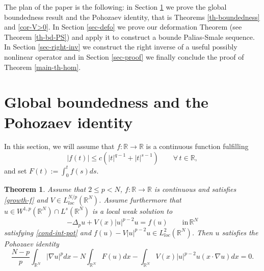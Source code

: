 \documentclass[11pt,reqno]{amsart}
\newtheorem{theorem}{Theorem}
\theoremstyle{definition}
\numberwithin{equation}{section}
\numberwithin{theorem}{section}
\numberwithin{equation}{section}
\numberwithin{theorem}{section}
\newcommand{\R}{\mathbb{R}}
\begin{document}
The plan of the paper is the following: in Section \ref{sec-global-bd} we prove the global boundedness result and the Pohozaev identity, that is Theorems \ref{th-boundedness} and \ref{cor-V>0}. In Section \ref{sec-defo} we prove our deformation Theorem (see Theorem \ref{th-bd-PS}) and apply it to construct a bounde Palias-Smale sequence. In Section \ref{sec-right-inv} we construct the right inverse of a useful possibly nonlinear operator and in Section \ref{sec-proof} we finally conclude the proof of Theorem \ref{main-th-hom}.


\section{Global boundedness and the Pohozaev identity}\label{sec-global-bd}
In this section, we will assume that $f:\R\to\R$ is a continuous function fulfilling 
\begin{equation}\label{growth-f}
|f(t)|\le c(|t|^{q-1}+|t|^{s-1})    \qquad\forall\, t\in\R,
\end{equation}
and set $F(t):=\int_0^t f(s)ds$.
\begin{theorem}\label{th-Pohozaev}
Assume that $2\le p<N$, $f:\R\to\R$ is continuous and satisfies \eqref{growth-f} and $V\in L^{N/p}_{loc}(\R^N)$. %
Assume furthermore that $u\in W^{1,p}(\R^N)\cap L^s(\R^N)$ is a local weak solution to
\begin{equation}
\label{eq-Pohozaev}
-\Delta_p u+V(x)|u|^{p-2}u=f(u)\qquad\text{in}\,\R^N
\end{equation}
satisfying \eqref{cond-int-pot} and $f(u)-V|u|^{p-2}u\in L^2_{loc}(\R^N)$. Then $u$ satisfies the Pohozaev identity
\begin{equation}\label{pohozaev}
\frac{N-p}{p}\int_{\R^N}|\nabla u|^pdx-N\int_{\R^N}F(u) dx-\int_{\R^N}V(x)|u|^{p-2}u(x\cdotp\nabla u)dx=0.  
\end{equation}    
\end{theorem}
\end{document}

